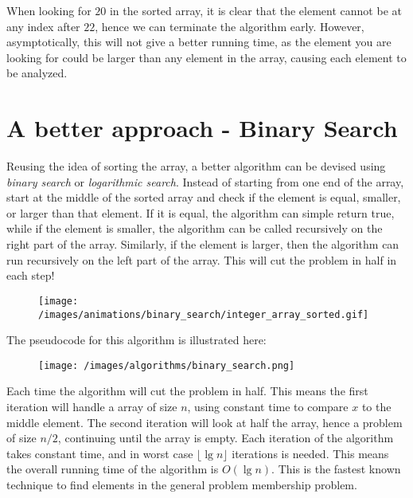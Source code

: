     When looking for $20$ in the sorted array, it is clear that the element cannot be at any index after $22$, hence we can terminate the algorithm early.
    However, asymptotically, this will not give a better running time, as the element you are looking for could be larger than any element in the array, causing each element to be analyzed.

    \section{A better approach - Binary Search}

        Reusing the idea of sorting the array, a better algorithm can be devised using \emph{binary search} or \emph{logarithmic search}.
        Instead of starting from one end of the array, start at the middle of the sorted array and check if the element is equal, smaller, or larger than that element.
        If it is equal, the algorithm can simple return true, while if the element is smaller, the algorithm can be called recursively on the right part of the array.
        Similarly, if the element is larger, then the algorithm can run recursively on the left part of the array.
        This will cut the problem in half in each step!

        \begin{figure}[!h]
            \centering
            \texttt{[image: /images/animations/binary\_search/integer\_array\_sorted.gif]}
        \end{figure}

        The pseudocode for this algorithm is illustrated here:

        \begin{figure}[!h]
            \centering
            \texttt{[image: /images/algorithms/binary\_search.png]}
        \end{figure}

        Each time the algorithm will cut the problem in half.
        This means the first iteration will handle a array of size $n$, using constant time to compare $x$ to the middle element.
        The second iteration will look at half the array, hence a problem of size $n/2$, continuing until the array is empty.
        Each iteration of the algorithm takes constant time, and in worst case $\lfloor\lg n \rfloor$ iterations is needed.
        This means the overall running time of the algorithm is $O(\lg n)$.
        This is the fastest known technique to find elements in the general problem membership problem.


